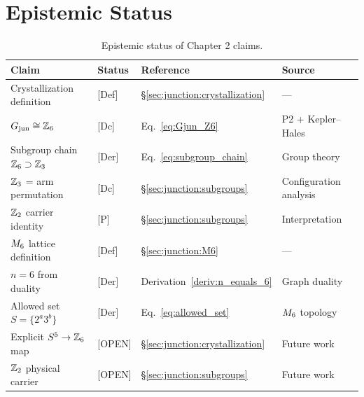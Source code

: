 \section{Epistemic Status}
\label{sec:junction:epistemic}

\begin{table}[htbp]
\centering
\caption{Epistemic status of Chapter 2 claims.}
\label{tab:ch2_epistemic}
\begin{tabular}{llll}
    \toprule
    \textbf{Claim} & \textbf{Status} & \textbf{Reference} & \textbf{Source} \\
    \midrule
    Crystallization definition & [Def] & \S\ref{sec:junction:crystallization} & — \\
    $G_{\text{jun}} \cong \mathbb{Z}_6$ & [Dc] & Eq.~\eqref{eq:Gjun_Z6} & P2 + Kepler--Hales \\
    Subgroup chain $\mathbb{Z}_6 \supset \mathbb{Z}_3$ & [Der] & Eq.~\eqref{eq:subgroup_chain} & Group theory \\
    $\mathbb{Z}_3$ = arm permutation & [Dc] & \S\ref{sec:junction:subgroups} & Configuration analysis \\
    $\mathbb{Z}_2$ carrier identity & [P] & \S\ref{sec:junction:subgroups} & Interpretation \\
    \midrule
    $M_6$ lattice definition & [Def] & \S\ref{sec:junction:M6} & — \\
    $n = 6$ from duality & [Der] & Derivation~\ref{deriv:n_equals_6} & Graph duality \\
    Allowed set $S = \{2^a 3^b\}$ & [Der] & Eq.~\eqref{eq:allowed_set} & $M_6$ topology \\
    \midrule
    Explicit $S^5 \to \mathbb{Z}_6$ map & [OPEN] & \S\ref{sec:junction:crystallization} & Future work \\
    $\mathbb{Z}_2$ physical carrier & [OPEN] & \S\ref{sec:junction:subgroups} & Future work \\
    \bottomrule
\end{tabular}
\end{table}


